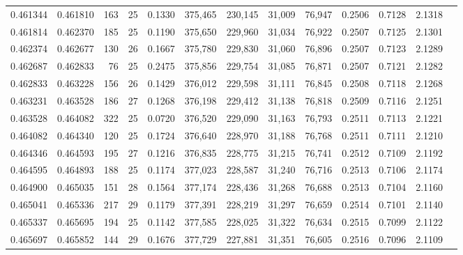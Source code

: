 \begin{tabular}{rrrrrrrrrrrrr}
0.461344 & 0.461810 &   163 &  25 &                                     0.1330 & 375,465 & 230,145 &  31,009 &  76,947 & 0.2506 & 0.7128 & 2.1318 \\
0.461814 & 0.462370 &   185 &  25 &                                     0.1190 & 375,650 & 229,960 &  31,034 &  76,922 & 0.2507 & 0.7125 & 2.1301 \\
0.462374 & 0.462677 &   130 &  26 &                                     0.1667 & 375,780 & 229,830 &  31,060 &  76,896 & 0.2507 & 0.7123 & 2.1289 \\
0.462687 & 0.462833 &    76 &  25 &                                     0.2475 & 375,856 & 229,754 &  31,085 &  76,871 & 0.2507 & 0.7121 & 2.1282 \\
0.462833 & 0.463228 &   156 &  26 &                                     0.1429 & 376,012 & 229,598 &  31,111 &  76,845 & 0.2508 & 0.7118 & 2.1268 \\
0.463231 & 0.463528 &   186 &  27 &                                     0.1268 & 376,198 & 229,412 &  31,138 &  76,818 & 0.2509 & 0.7116 & 2.1251 \\
0.463528 & 0.464082 &   322 &  25 &                                     0.0720 & 376,520 & 229,090 &  31,163 &  76,793 & 0.2511 & 0.7113 & 2.1221 \\
0.464082 & 0.464340 &   120 &  25 &                                     0.1724 & 376,640 & 228,970 &  31,188 &  76,768 & 0.2511 & 0.7111 & 2.1210 \\
0.464346 & 0.464593 &   195 &  27 &                                     0.1216 & 376,835 & 228,775 &  31,215 &  76,741 & 0.2512 & 0.7109 & 2.1192 \\
0.464595 & 0.464893 &   188 &  25 &                                     0.1174 & 377,023 & 228,587 &  31,240 &  76,716 & 0.2513 & 0.7106 & 2.1174 \\
0.464900 & 0.465035 &   151 &  28 &                                     0.1564 & 377,174 & 228,436 &  31,268 &  76,688 & 0.2513 & 0.7104 & 2.1160 \\
0.465041 & 0.465336 &   217 &  29 &                                     0.1179 & 377,391 & 228,219 &  31,297 &  76,659 & 0.2514 & 0.7101 & 2.1140 \\
0.465337 & 0.465695 &   194 &  25 &                                     0.1142 & 377,585 & 228,025 &  31,322 &  76,634 & 0.2515 & 0.7099 & 2.1122 \\
0.465697 & 0.465852 &   144 &  29 &                                     0.1676 & 377,729 & 227,881 &  31,351 &  76,605 & 0.2516 & 0.7096 & 2.1109 \\

\end{tabular}
